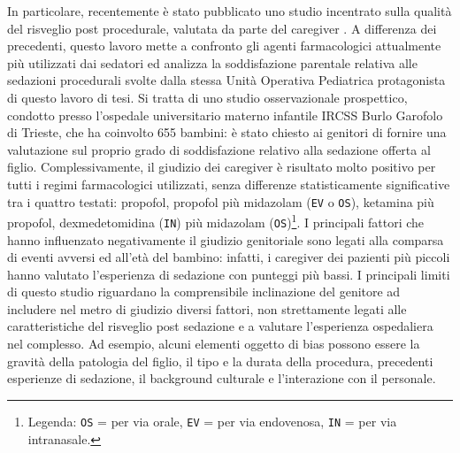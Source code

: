 In particolare, recentemente è stato pubblicato uno studio incentrato sulla qualità del risveglio post procedurale, valutata da parte del caregiver \citep{Cortellazzo2022}. A differenza dei precedenti, questo lavoro mette a confronto gli agenti farmacologici attualmente più utilizzati dai sedatori ed analizza la soddisfazione parentale relativa alle sedazioni procedurali svolte dalla stessa Unità Operativa Pediatrica protagonista di questo lavoro di tesi. Si tratta di uno studio osservazionale prospettico, condotto presso l'ospedale universitario materno infantile IRCSS Burlo Garofolo di Trieste, che ha coinvolto 655 bambini: è stato chiesto ai genitori di fornire una valutazione sul proprio grado di soddisfazione relativo alla sedazione offerta al figlio. Complessivamente, il giudizio dei caregiver è risultato molto positivo per tutti i regimi farmacologici utilizzati, senza differenze statisticamente significative tra i quattro testati: propofol, propofol più midazolam (\texttt{EV} o \texttt{OS}), ketamina più propofol, dexmedetomidina (\texttt{IN}) più midazolam (\texttt{OS})\footnote{Legenda: \texttt{OS} = per via orale, \texttt{EV} = per via endovenosa, \texttt{IN} = per via intranasale.}. I principali fattori che hanno influenzato negativamente il giudizio genitoriale sono legati alla comparsa di eventi avversi ed all’età del bambino: infatti, i caregiver dei pazienti più piccoli hanno valutato l’esperienza di sedazione con punteggi più bassi. I principali limiti di questo studio riguardano la comprensibile inclinazione del genitore ad includere nel metro di giudizio diversi fattori, non strettamente legati alle caratteristiche del risveglio post sedazione e a valutare l’esperienza ospedaliera nel complesso. Ad esempio, alcuni elementi oggetto di bias possono essere la gravità della patologia del figlio, il tipo e la durata della procedura, precedenti esperienze di sedazione, il background culturale e l’interazione con il personale. 

